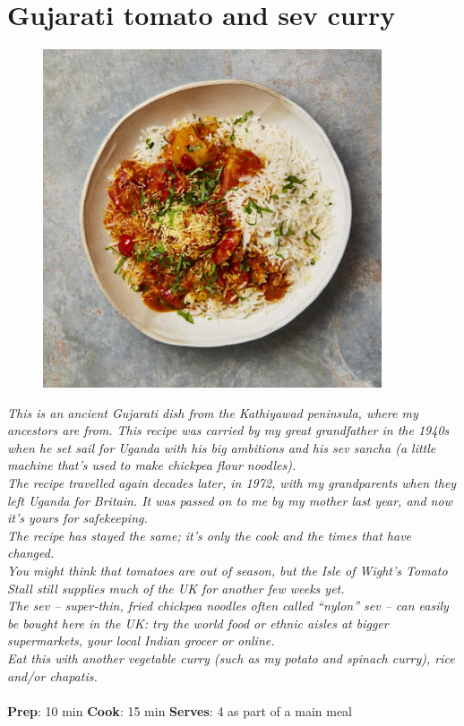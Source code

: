 \documentclass{book}
\begin{document}
\section{Gujarati tomato and sev curry}
\begin{figure}
\centering\includegraphics[width=10cm,height=10cm,keepaspectratio]{Recipe_Pictures/Gujarati_tomato_and_sev_curry.png}
\end{figure}
\emph{This is an ancient Gujarati dish from the Kathiyawad peninsula, where my ancestors are from. This recipe was carried by my great grandfather in the 1940s when he set sail for Uganda with his big ambitions and his sev sancha (a little machine that’s used to make chickpea flour noodles).\\ 
The recipe travelled again decades later, in 1972, with my grandparents when they left Uganda for Britain. It was passed on to me by my mother last year, and now it’s yours for safekeeping.\\ 
The recipe has stayed the same; it’s only the cook and the times that have changed.\\ 
You might think that tomatoes are out of season, but the Isle of Wight’s Tomato Stall still supplies much of the UK for another few weeks yet.\\ 
The sev – super-thin, fried chickpea noodles often called “nylon” sev – can easily be bought here in the UK: try the world food or ethnic aisles at bigger supermarkets, your local Indian grocer or online. \\ 
Eat this with another vegetable curry (such as my potato and spinach curry), rice and/or chapatis.}\\\\ 
\textbf{Prep}: 10 min
\textbf{Cook}: 15 min
\textbf{Serves}: 4 as part of a main meal
\end{document}
